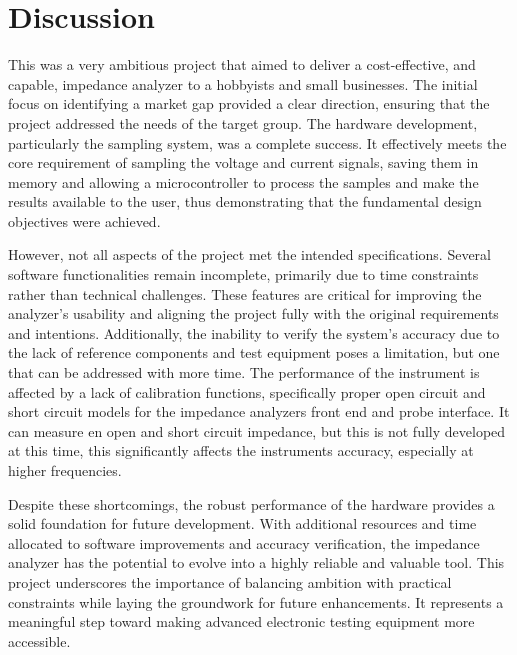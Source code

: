 \chapter{Discussion} \label{ch:Discussion}

This was a very ambitious project that aimed to deliver a cost-effective, and capable, impedance analyzer to a hobbyists and small businesses. The initial focus on identifying a market gap provided a clear direction, ensuring that the project addressed the needs of the target group. The hardware development, particularly the sampling system, was a complete success. It effectively meets the core requirement of sampling the voltage and current signals, saving them in memory and allowing a microcontroller to process the samples and make the results available to the user, thus demonstrating that the fundamental design objectives were achieved.

However, not all aspects of the project met the intended specifications. Several software functionalities remain incomplete, primarily due to time constraints rather than technical challenges. These features are critical for improving the analyzer's usability and aligning the project fully with the original requirements and intentions. Additionally, the inability to verify the system's accuracy due to the lack of reference components and test equipment poses a limitation, but one that can be addressed with more time. The performance of the instrument is affected by a lack of calibration functions, specifically proper open circuit and short circuit models for the impedance analyzers front end and probe interface. It can measure en open and short circuit impedance, but this is not fully developed at this time, this significantly affects the instruments accuracy, especially at higher frequencies.

Despite these shortcomings, the robust performance of the hardware provides a solid foundation for future development. With additional resources and time allocated to software improvements and accuracy verification, the impedance analyzer has the potential to evolve into a highly reliable and valuable tool. This project underscores the importance of balancing ambition with practical constraints while laying the groundwork for future enhancements. It represents a meaningful step toward making advanced electronic testing equipment more accessible.